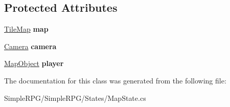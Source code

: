 \subsection*{Protected Attributes}
\begin{DoxyCompactItemize}
\item 
\hypertarget{class_simple_r_p_g_1_1_states_1_1_map_state_a39f94c5063719b3a3f7657e8ed17fed6}{\hyperlink{class_simple_r_p_g_1_1_tile_map}{Tile\-Map} {\bfseries map}}\label{class_simple_r_p_g_1_1_states_1_1_map_state_a39f94c5063719b3a3f7657e8ed17fed6}

\item 
\hypertarget{class_simple_r_p_g_1_1_states_1_1_map_state_a8b39dc14b2f3e3c3b8120bf31ec79b74}{\hyperlink{class_simple_r_p_g_1_1_camera}{Camera} {\bfseries camera}}\label{class_simple_r_p_g_1_1_states_1_1_map_state_a8b39dc14b2f3e3c3b8120bf31ec79b74}

\item 
\hypertarget{class_simple_r_p_g_1_1_states_1_1_map_state_a106c108b36c278592bd8b2a660b40949}{\hyperlink{class_simple_r_p_g_1_1_map_object}{Map\-Object} {\bfseries player}}\label{class_simple_r_p_g_1_1_states_1_1_map_state_a106c108b36c278592bd8b2a660b40949}

\end{DoxyCompactItemize}


The documentation for this class was generated from the following file\-:\begin{DoxyCompactItemize}
\item 
Simple\-R\-P\-G/\-Simple\-R\-P\-G/\-States/Map\-State.\-cs\end{DoxyCompactItemize}
